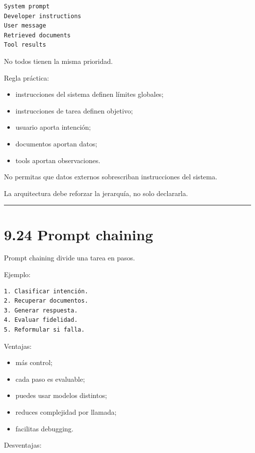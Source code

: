 \begin{lstlisting}
System prompt
Developer instructions
User message
Retrieved documents
Tool results
\end{lstlisting}

No todos tienen la misma prioridad.

Regla práctica:

\begin{itemize}
\tightlist
\item
  instrucciones del sistema definen límites globales;
\item
  instrucciones de tarea definen objetivo;
\item
  usuario aporta intención;
\item
  documentos aportan datos;
\item
  tools aportan observaciones.
\end{itemize}

No permitas que datos externos sobrescriban instrucciones del sistema.

La arquitectura debe reforzar la jerarquía, no solo declararla.

\begin{center}\rule{0.5\linewidth}{0.5pt}\end{center}

\section{9.24 Prompt chaining}\label{prompt-chaining}

Prompt chaining divide una tarea en pasos.

Ejemplo:

\begin{lstlisting}
1. Clasificar intención.
2. Recuperar documentos.
3. Generar respuesta.
4. Evaluar fidelidad.
5. Reformular si falla.
\end{lstlisting}

Ventajas:

\begin{itemize}
\tightlist
\item
  más control;
\item
  cada paso es evaluable;
\item
  puedes usar modelos distintos;
\item
  reduces complejidad por llamada;
\item
  facilitas debugging.
\end{itemize}

Desventajas:

